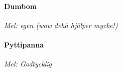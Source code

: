 ﻿\noindent
\begin{minipage}{.475\textwidth}
    \paragraph*{Dumbom\\}
    \vspace{3px}
    \textit{Mel: egen (wow dehä hjälper mycke!)}\\
\end{minipage}%
\hspace{0.075\textwidth}
\noindent
\begin{minipage}{.45\textwidth}
    \paragraph*{Pyttipanna\\}
    \vspace{3px}
    \textit{Mel: Godtycklig}\\
\end{minipage}

